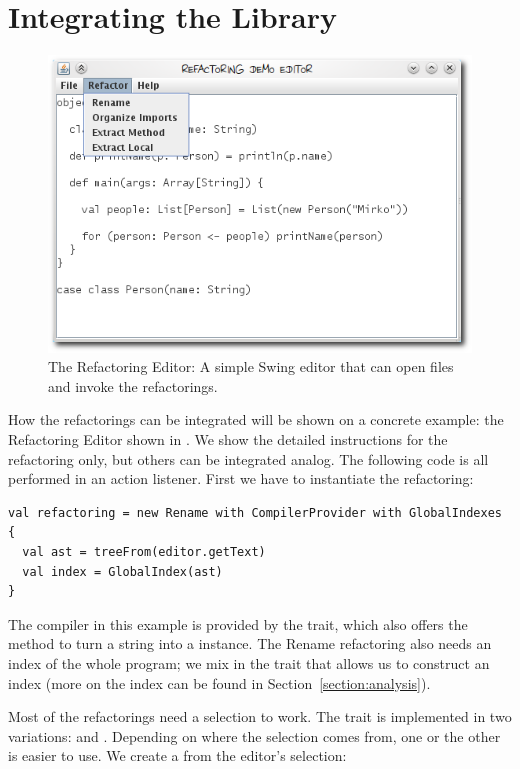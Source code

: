 \documentclass[10pt,a4paper,oneside]{scrreprt}
\begin{document}
\section{Integrating the Library}

\begin{figure}
  \centering
  \includegraphics[width=0.7\linewidth]{refactoring-editor.png}
  \caption{The Refactoring Editor: A simple Swing editor that can open files and invoke the refactorings.}
  \label{figure:refactoring-editor}
\end{figure}

How the refactorings can be integrated will be shown on a concrete example: the Refactoring Editor shown in . We show the detailed instructions for the  refactoring only, but others can be integrated analog. The following code is all performed in an action listener. First we have to instantiate the refactoring:

\begin{lstlisting}
val refactoring = new Rename with CompilerProvider with GlobalIndexes {
  val ast = treeFrom(editor.getText)
  val index = GlobalIndex(ast)
}
\end{lstlisting}

The compiler in this example is provided by the  trait, which also offers the  method to turn a string into a  instance. The Rename refactoring also needs an index of the whole program; we mix in the  trait that allows us to construct an index (more on the index can be found in Section~\vref{section:analysis}).

Most of the refactorings need a selection to work. The  trait is implemented in two variations:  and . Depending on where the selection comes from, one or the other is easier to use. We create a  from the editor's selection:
\end{document}
